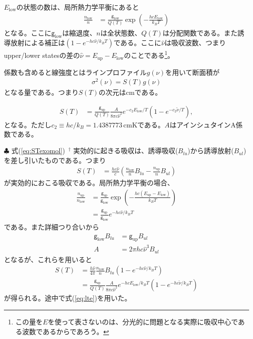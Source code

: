 $E_\mathrm{low}$の状態の数は、局所熱力学平衡にあると
\begin{align}
\label{eq:lte}
    \frac{n_\mathrm{low}}{n} &= \frac{\mathsf{g}_\mathrm{low}}{Q(T)} \exp{\left(- \frac{h c E_\mathrm{low}}{k_B T} \right)}
\end{align}
となる。ここに$\mathsf{g}_\mathrm{low}$は縮退度、$n$は全状態数、$Q(T)$は分配関数である。また誘導放射による補正は$(1- e^{-h c \hat{\nu}/k_B T})$である。ここに$\hat{\nu}$は吸収波数、つまりupper/lower statesの差の$\hat{\nu} = E_\mathrm{up} - E_\mathrm{low}$のことである\footnote{この量を$E$を使って表さないのは、分光的に問題となる実際に吸収中心である波数であるからであろう。}。

係数も含めると線強度とはラインプロファイル$g(\nu)$を用いて断面積が
\begin{align}
    \sigma^2 (\nu) = S(T) g(\nu)
\end{align}
となる量である。つまり$S(T)$の次元は$\mathrm{cm}$である。

\begin{align}
\label{eq:STexomol}
S(T) &=\displaystyle{ \frac{\mathsf{g}_\mathrm{up}}{Q(T)} \frac{ A}{8 \pi c \hat{\nu}^2} e^{-  c_2 E_\mathrm{low}/T} {\left(1- e^{-c_2 \tilde{\nu}/T}\right)}},
\end{align}
となる。ただし$c_2 \equiv hc/k_B = 1.4387773 \, \mathrm{cm K}$である。$A$はアインシュタインA係数である。

\begin{itembox}{$\clubsuit$ 式(\ref{eq:STexomol}) $\,^\dagger$}
\footnotesize
実効的に起きる吸収は、誘導吸収($B_{lu}$)から誘導放射($B_{ul}$)を差し引いたものである。つまり
\begin{align}
    S(T) &= \frac{h c \hat{\nu}}{c} \left( \frac{n_\mathrm{low}}{n} B_{lu} - \frac{n_\mathrm{up}}{n} B_{ul} \right) 
\end{align}
が実効的におこる吸収である。局所熱力学平衡の場合、
\begin{align}
     \frac{n_\mathrm{up}}{n_\mathrm{low}} &= \frac{\mathsf{g}_\mathrm{up}}{\mathsf{g}_\mathrm{low}} \exp{\left(- \frac{h c (E_\mathrm{up} - E_\mathrm{low})}{k_B T} \right)} \\
     &= \frac{\mathsf{g}_\mathrm{up}}{\mathsf{g}_\mathrm{low}} e^{-hc \hat{\nu}/k_B T}
\end{align}
である。また詳細つり合いから
\begin{align}
    \mathsf{g}_\mathrm{low} B_{lu} &= \mathsf{g}_\mathrm{up} B_{ul} \\
    A &= 2 \pi h c \hat{\nu}^3 B_{ul}
\end{align}
となるが、これらを用いると
\begin{align}
    S(T) &= \frac{h \hat{\nu}}{4 \pi} \frac{n_\mathrm{low}}{n} B_{lu} (1 -  e^{-hc \hat{\nu}/k_B T}) \\
    &= \frac{\mathsf{g}_\mathrm{up}}{Q(T)} \frac{ A}{8 \pi c \hat{\nu}^2} e^{- h c E_\mathrm{low}/k_B T} {\left(1- e^{- h c \tilde{\nu}/k_B T}\right)}
\end{align}
が得られる。途中で式(\ref{eq:lte})を用いた。
\end{itembox}



